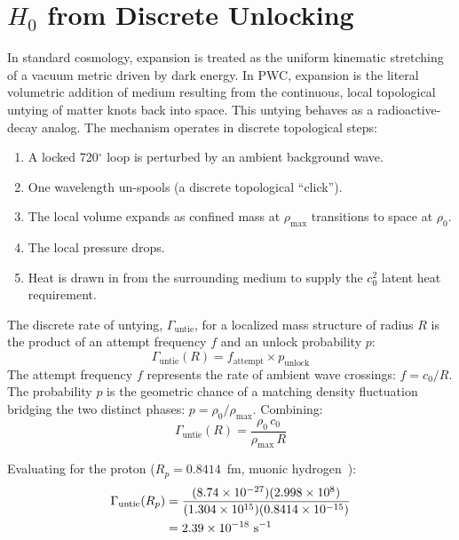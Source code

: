 \documentclass[aps,prd,twocolumn,superscriptaddress,amsmath,amssymb,nofootinbib,floatfix]{revtex4-2}
\newcommand{\rhomax}{\rho_{\max}}
\newcommand{\rhonaught}{\rho_{0}}
\newcommand{\cnaught}{c_{0}}
\begin{document}
\section{$H_0$ from Discrete Unlocking}
\label{sec:t7}

In standard cosmology, expansion is treated as the uniform kinematic stretching of a vacuum metric driven by dark energy. In PWC, expansion is the literal volumetric addition of medium resulting from the continuous, local topological untying of matter knots back into space. This untying behaves as a radioactive-decay analog. The mechanism operates in discrete topological steps:

\begin{enumerate}
\item A locked 720$^{\circ}$ loop is perturbed by an ambient background wave.
\item One wavelength un-spools (a discrete topological ``click'').
\item The local volume expands as confined mass at $\rhomax$ transitions to space at $\rhonaught$.
\item The local pressure drops.
\item Heat is drawn in from the surrounding medium to supply the $\cnaught^{2}$ latent heat requirement.
\end{enumerate}

The discrete rate of untying, $\Gamma_{\text{untie}}$, for a localized mass structure of radius $R$ is the product of an attempt frequency $f$ and an unlock probability $p$:
\begin{equation}
\Gamma_{\text{untie}}(R) = f_{\text{attempt}} \times p_{\text{unlock}}
\end{equation}
The attempt frequency $f$ represents the rate of ambient wave crossings: $f = \cnaught/R$. The probability $p$ is the geometric chance of a matching density fluctuation bridging the two distinct phases: $p = \rhonaught/\rhomax$. Combining:
\begin{equation}
\Gamma_{\text{untie}}(R) = \frac{\rhonaught \, \cnaught}{\rhomax \, R}
\label{eq:gammauntie}
\end{equation}

Evaluating for the proton ($R_p = 0.8414$~fm, muonic hydrogen~\cite{Antognini2013}):
\begin{align}
\Gamma_{\text{untie}}(R_p) &= \frac{(8.74 \times 10^{-27})(2.998 \times 10^{8})}{(1.304 \times 10^{15})(0.8414 \times 10^{-15})} \notag \\
&= 2.39 \times 10^{-18}~\text{s}^{-1}
\end{align}
\end{document}
